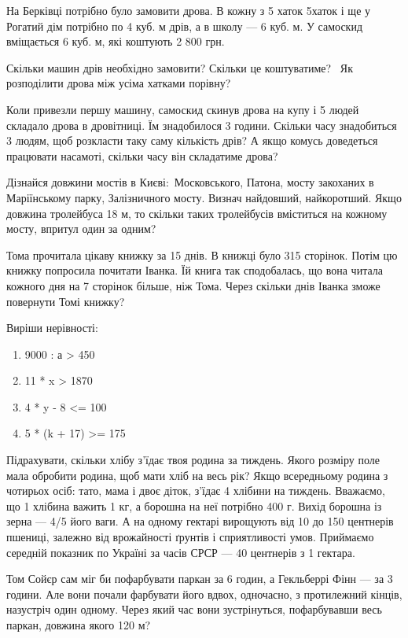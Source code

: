 \problem
На Берківці потрібно було замовити дрова.
В кожну з 5 хаток 5хаток і ще у Рогатий дім потрібно по 4 куб. м дрів,
а в школу --- 6 куб. м.
У самоскид вміщається 6 куб. м, які коштують 2 800 грн.

Скільки машин дрів необхідно замовити? Скільки це коштуватиме? 
Як розподілити дрова між усіма хатками порівну?

Коли привезли першу машину, самоскид скинув дрова на купу і 5 людей
складало дрова в дровітниці. Їм знадобилося 3 години.
Скільки часу знадобиться 3 людям, щоб розкласти таку саму кількість дрів?
А якщо комусь доведеться працювати насамоті, скільки часу він складатиме дрова?


\problem
Дізнайся довжини мостів в Києві: Московського, Патона,
мосту закоханих в Маріїнському парку, Залізничного мосту.
Визнач найдовший, найкоротший.
Якщо довжина тролейбуса 18 м, то скільки таких тролейбусів
вміститься на кожному мосту, впритул один за одним?


\problem
Тома прочитала цікаву книжку за 15 днів. В книжці було 315 сторінок.
Потім цю книжку попросила почитати Іванка. Їй книга так сподобалась,
що вона читала кожного дня на 7 сторінок більше, ніж Тома.
Через скільки днів Іванка зможе повернути Томі книжку?


\problem
Виріши нерівності:
\begin{multicols}{2}
    \begin{enumerate}
        \item 9000 : а > 450
        \item 11 * x > 1870
        \item 4 * y - 8 <= 100
        \item 5 * (k + 17) >= 175
    \end{enumerate}
\end{multicols}


\problem
Підрахувати, скільки хлібу з’їдає твоя родина за тиждень.
Якого розміру поле мала обробити родина, щоб мати хліб на весь рік?
Якщо всередньому родина з чотирьох осіб: тато, мама і двоє діток,
з’їдає 4 хлібини на тиждень. Вважаємо, що 1 хлібина важить 1 кг,
а борошна на неї потрібно 400 г. Вихід борошна із зерна --- 4/5 його ваги.
А на одному гектарі вирощують від 10 до 150 центнерів пшениці,
залежно від врожайності ґрунтів і сприятливості умов.
Приймаємо середній показник по Україні за часів СРСР ---
40 центнерів з 1 гектара.


\problem
Том Сойєр сам міг би пофарбувати паркан за 6 годин,
а Гекльберрі Фінн --- за 3 години. Але вони почали фарбувати його вдвох,
одночасно, з протилежний кінців, назустріч один одному.
Через який час вони зустрінуться, пофарбувавши весь паркан,
довжина якого 120 м?


